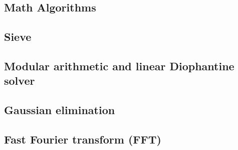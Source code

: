 \documentclass[12pt]{extarticle}
\begin{document}
\begin{multicols*}{2}
\section{Math Algorithms}

\subsection{Sieve} %


\subsection{Modular arithmetic and linear Diophantine solver} %


\subsection{Gaussian elimination} %



\subsection{Fast Fourier transform (FFT)} %



\end{multicols*}
\end{document}
